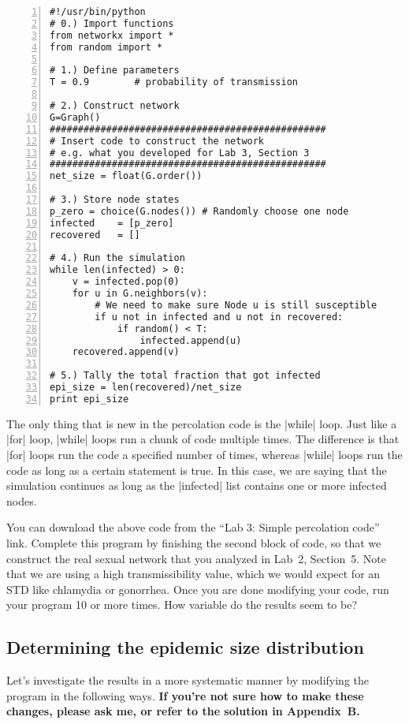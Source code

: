 \documentclass{article}
\begin{document}
\begin{Verbatim}[numbers=left, samepage=true]
#!/usr/bin/python
# 0.) Import functions
from networkx import *
from random import *

# 1.) Define parameters
T = 0.9        # probability of transmission

# 2.) Construct network
G=Graph()
#################################################
# Insert code to construct the network
# e.g. what you developed for Lab 3, Section 3
#################################################
net_size = float(G.order())

# 3.) Store node states
p_zero = choice(G.nodes()) # Randomly choose one node
infected    = [p_zero]
recovered   = []

# 4.) Run the simulation
while len(infected) > 0:
    v = infected.pop(0)
    for u in G.neighbors(v):
        # We need to make sure Node u is still susceptible
        if u not in infected and u not in recovered:
            if random() < T:
                infected.append(u)
    recovered.append(v)

# 5.) Tally the total fraction that got infected
epi_size = len(recovered)/net_size
print epi_size
\end{Verbatim}

The only thing that is new in the percolation code is the |while| loop.  Just like a |for| loop, |while| loops run a chunk of code multiple times.  The
difference is that |for| loops run the code a specified number of times, whereas |while| loops run the code as long as a certain statement is true.  In
this case, we are saying that the simulation continues as long as the |infected| list contains one or more infected nodes.

You can download the above code from the ``Lab 3: Simple percolation code'' link.  Complete this program by finishing the second block of code, so that
we construct the real sexual network that you analyzed in Lab~2, Section~5.  Note that we are using a high transmissibility value, which we would expect
for an STD like chlamydia or gonorrhea.  Once you are done modifying your code, run your program 10 or more times.  How 
variable do the results seem to be?

\subsection{Determining the epidemic size distribution}
\label{epi_size}
Let's investigate the results in a more systematic manner by modifying the program in the following ways.  \textbf{If you're
not sure how to make these changes, please ask me, or refer to the solution in Appendix~B.}
\end{document}
